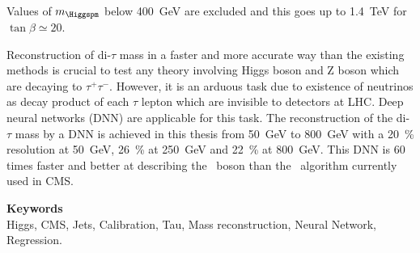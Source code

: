 Values of $m_{\Higgspm}$ below \SI{400}{\GeV} are excluded
and this goes up to 
\SI{1.4}{\TeV} for $\tan\beta\simeq\num{20}$.
\par
Reconstruction of di-$\tau$ mass in a faster and more accurate way than the existing methods is crucial to test any theory involving Higgs boson and Z boson which are decaying to $\tau^+ \tau^-$. 
However, it is an arduous task due to existence of neutrinos as decay product of each $\tau$ lepton which are invisible to detectors at LHC. 
Deep neural networks (DNN) are applicable for this task. 
The reconstruction of the di-$\tau$ mass by a DNN
is achieved in this thesis
from 
\SI{50}{\GeV} to \SI{800}{\GeV}
with a
\SI{20}{\%} resolution at \SI{50}{\GeV},
\SI{26}{\%} at \SI{250}{\GeV} and
\SI{22}{\%} at \SI{800}{\GeV}.
This DNN is
60 times faster
and
better at describing the \Zboson~boson
than the \SVFIT\ algorithm currently used in CMS.

\vfill

\textbf{\Large Keywords}\\
Higgs,
CMS,
Jets,
Calibration,
Tau,
Mass reconstruction,
Neural Network,
Regression.

\vfill
